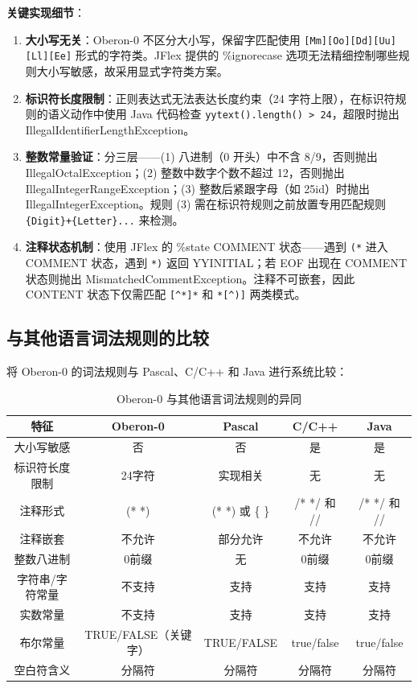 \textbf{关键实现细节}：
\begin{enumerate}
    \item \textbf{大小写无关}：Oberon-0 不区分大小写，保留字匹配使用 \texttt{[Mm][Oo][Dd][Uu][Ll][Ee]} 形式的字符类。JFlex 提供的 \%ignorecase 选项无法精细控制哪些规则大小写敏感，故采用显式字符类方案。
    \item \textbf{标识符长度限制}：正则表达式无法表达长度约束（24 字符上限），在标识符规则的语义动作中使用 Java 代码检查 \texttt{yytext().length() > 24}，超限时抛出 IllegalIdentifierLengthException。
    \item \textbf{整数常量验证}：分三层——(1) 八进制（0 开头）中不含 8/9，否则抛出 IllegalOctalException；(2) 整数中数字个数不超过 12，否则抛出 IllegalIntegerRangeException；(3) 整数后紧跟字母（如 25id）时抛出 IllegalIntegerException。规则 (3) 需在标识符规则之前放置专用匹配规则 \texttt{\{Digit\}+\{Letter\}...} 来检测。
    \item \textbf{注释状态机制}：使用 JFlex 的 \%state COMMENT 状态——遇到 \texttt{(*} 进入 COMMENT 状态，遇到 \texttt{*)} 返回 YYINITIAL；若 EOF 出现在 COMMENT 状态则抛出 MismatchedCommentException。注释不可嵌套，因此 CONTENT 状态下仅需匹配 \texttt{[^*]*} 和 \texttt{*[^)]} 两类模式。
\end{enumerate}

\subsection{与其他语言词法规则的比较}

将 Oberon-0 的词法规则与 Pascal、C/C++ 和 Java 进行系统比较：

\begin{table}[htbp]
    \centering
    \begin{tabular}{|c|c|c|c|c|}
    \hline
    \textbf{特征} & \textbf{Oberon-0} & \textbf{Pascal} & \textbf{C/C++} & \textbf{Java} \\
    \hline
    大小写敏感 & 否 & 否 & 是 & 是 \\
    标识符长度限制 & 24字符 & 实现相关 & 无 & 无 \\
    注释形式 & (* *) & (* *) 或 \{ \} & /* */ 和 // & /* */ 和 // \\
    注释嵌套 & 不允许 & 部分允许 & 不允许 & 不允许 \\
    整数八进制 & 0前缀 & 无 & 0前缀 & 0前缀 \\
    字符串/字符常量 & 不支持 & 支持 & 支持 & 支持 \\
    实数常量 & 不支持 & 支持 & 支持 & 支持 \\
    布尔常量 & TRUE/FALSE（关键字） & TRUE/FALSE & true/false & true/false \\
    空白符含义 & 分隔符 & 分隔符 & 分隔符 & 分隔符 \\
    \hline
    \end{tabular}
    \caption{Oberon-0 与其他语言词法规则的异同}
    \label{tab:lex-compare}
\end{table}

